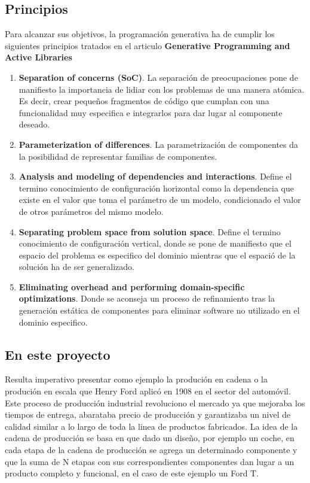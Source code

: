 \documentclass[a4paper,11pt]{book}
\begin{document}
\subsection{Principios}

Para alcanzar sus objetivos, la programación generativa ha de cumplir los siguientes principios tratados en el articulo \textbf{Generative Programming and Active Libraries}\cite{gpl}

\begin{enumerate}
\item \textbf{Separation of concerns (SoC)}. La separación de preocupaciones pone de manifiesto la importancia de lidiar con los problemas de una manera atómica. Es decir, crear pequeños fragmentos de código que cumplan con una funcionalidad muy especifica e integrarlos para dar lugar al componente deseado.
\item \textbf{Parameterization of differences}.  La parametrización de componentes da la posibilidad de representar familias de componentes.
\item \textbf{Analysis and modeling of dependencies and interactions}.  Define el termino conocimiento de configuración horizontal como la dependencia que existe en el valor que toma el parámetro de un modelo, condicionado el valor de otros parámetros del mismo modelo.
\item \textbf{Separating problem space from solution space}.  Define el termino conocimiento de configuración vertical, donde se pone de manifiesto que el espacio del problema es especifico del dominio mientras que el espació de la solución ha de ser generalizado.
\item \textbf{Eliminating overhead and performing domain-specific optimizations}.  Donde se aconseja un proceso de refinamiento tras la generación estática de componentes para eliminar software no utilizado en el dominio especifico.
\end{enumerate}

\subsection{En este proyecto}

Resulta imperativo presentar como ejemplo  la produción en cadena o la produción en escala que Henry Ford aplicó en 1908 en el sector del automóvil. Este proceso de producción industrial revoluciono el mercado ya que mejoraba los tiempos de entrega, abarataba precio de producción y garantizaba un nivel de calidad similar a lo largo de toda la linea de productos fabricados. La idea de la cadena de producción se basa en que dado un diseño, por ejemplo un coche, en cada etapa de la cadena de producción  se agrega un determinado componente y que la suma de N etapas con sus correspondientes componentes dan lugar a un producto completo y funcional, en el caso de este ejemplo un Ford T. 
\end{document}
